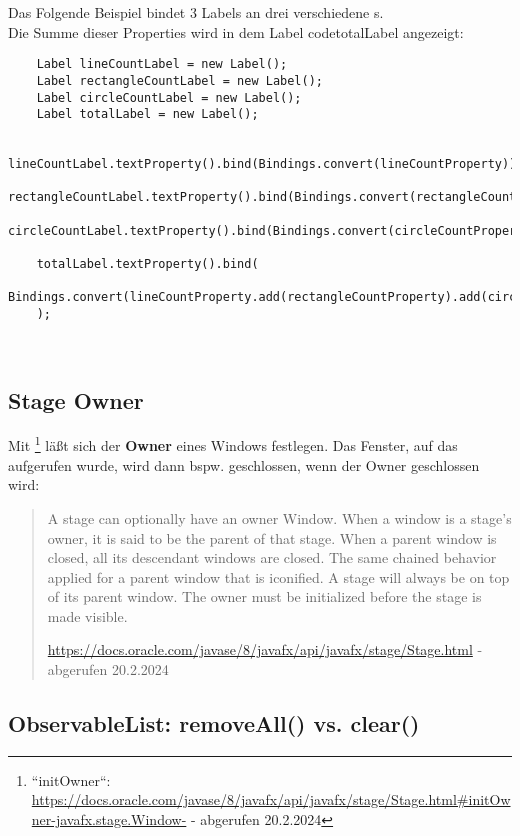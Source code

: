 \noindent
Das Folgende Beispiel bindet 3 Labels an drei verschiedene s.\\
Die Summe dieser Properties wird in dem Label code{totalLabel} angezeigt:
\begin{verbatim}
    Label lineCountLabel = new Label();
    Label rectangleCountLabel = new Label();
    Label circleCountLabel = new Label();
    Label totalLabel = new Label();

    lineCountLabel.textProperty().bind(Bindings.convert(lineCountProperty));
    rectangleCountLabel.textProperty().bind(Bindings.convert(rectangleCountProperty));
    circleCountLabel.textProperty().bind(Bindings.convert(circleCountProperty));

    totalLabel.textProperty().bind(
        Bindings.convert(lineCountProperty.add(rectangleCountProperty).add(circleCountProperty))
    );
\end{verbatim}\\

\subsection*{Stage Owner}

Mit \footnote{
``initOwner``: \url{https://docs.oracle.com/javase/8/javafx/api/javafx/stage/Stage.html#initOwner-javafx.stage.Window-} - abgerufen 20.2.2024
} läßt sich der \textbf{Owner} eines Windows festlegen.
Das Fenster, auf das  aufgerufen wurde, wird dann bspw. geschlossen, wenn der Owner geschlossen wird:

\blockquote[{\url{https://docs.oracle.com/javase/8/javafx/api/javafx/stage/Stage.html} - abgerufen 20.2.2024}]{
    A stage can optionally have an owner Window. When a window is a stage's owner, it is said to be the parent of that stage. When a parent window is closed, all its descendant windows are closed. The same chained behavior applied for a parent window that is iconified. A stage will always be on top of its parent window. The owner must be initialized before the stage is made visible.
}

\subsection*{ObservableList: removeAll() vs. clear()}

